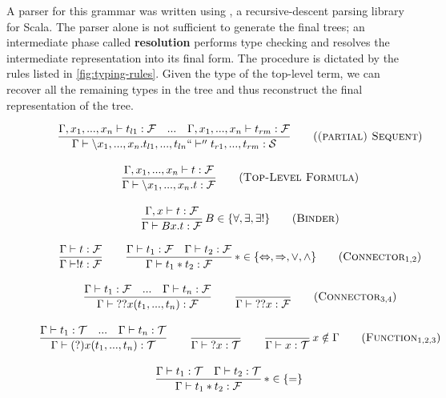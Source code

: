 A parser for this grammar was written using  \cite{Moors2008}, a recursive-descent parsing library for Scala. The parser alone is not sufficient to generate the final trees; an intermediate phase called \textbf{resolution} performs type checking and resolves the intermediate representation into its final form. The procedure is dictated by the rules listed in \autoref{fig:typing-rules}. Given the type of the top-level term, we can recover all the remaining types in the tree and thus reconstruct the final representation of the tree.

\begin{figure}[H]
  \centering
  \begin{framed}
  \begin{gather}
  \frac{\Gamma, x_1, ..., x_n \vdash t_{l1}: \mathcal{F} \quad ... \quad \Gamma, x_1, ..., x_n \vdash t_{rm}: \mathcal{F}}{\Gamma \vdash \backslash x_1, ..., x_n. t_{l1}, ..., t_{ln} ``\vdash'' t_{r1}, ..., t_{rm}: \mathcal{S}} \tag{\textsc{(partial) Sequent}} \\[1em]
  \frac{\Gamma, x_1, ..., x_n \vdash t: \mathcal{F}}{\Gamma \vdash \backslash x_1, ..., x_n. t: \mathcal{F}} \tag{\textsc{Top-Level Formula}} \\[1em]
  \frac{\Gamma, x \vdash t: \mathcal{F}}{\Gamma \vdash B x. t: \mathcal{F}} \mkern3mu B \in \{\forall, \exists, \exists!\} \tag{\textsc{Binder}} \\[1em]
  \frac{\Gamma \vdash t: \mathcal{F}}{\Gamma \vdash !t: \mathcal{F}} \quad\quad
  \frac{\Gamma \vdash t_1: \mathcal{F} \quad \Gamma \vdash t_2: \mathcal{F}}{\Gamma \vdash t_1 \ast t_2 : \mathcal{F}} \mkern3mu \ast \in \{\Leftrightarrow, \Rightarrow, \lor, \land\}
  \tag{$\textsc{Connector}_{1,2}$} \\[1em]
  \frac{\Gamma \vdash t_1: \mathcal{F} \quad ... \quad \Gamma \vdash t_n: \mathcal{F}}{\Gamma \vdash {??x}(t_1, ..., t_n) : \mathcal{F}} \quad\quad
  \frac{}{\Gamma \vdash {??x}: \mathcal{F}}
  \tag{$\textsc{Connector}_{3,4}$} \\[1em]
  \frac{\Gamma \vdash t_1: \mathcal{T} \quad ... \quad \Gamma \vdash t_n: \mathcal{T}}{\Gamma \vdash (?)x(t_1, ..., t_n): \mathcal{T}} \quad\quad
  \frac{}{\Gamma \vdash {?x}: \mathcal{T}} \quad\quad
  \frac{}{\Gamma \vdash x: \mathcal{T}} \mkern3mu x \notin \Gamma
  \tag{$\textsc{Function}_{1,2,3}$} \\[1em]
  \frac{\Gamma \vdash t_1: \mathcal{T} \quad \Gamma \vdash t_2: \mathcal{T}}{\Gamma \vdash t_1 \ast t_2: \mathcal{F}} \mkern3mu \ast \in \{=\} \quad\quad

\end{gather}
\end{framed}
\end{figure}

